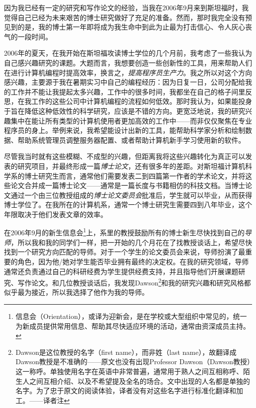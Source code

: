\documentclass[letter,12pt]{book}
\begin{document}
\begin{CJK}{UTF8}{gbsn}
因为我已经有一定的研究和写作论文的经验，当我在2006年9月来到斯坦福时，我觉得自己已经为未来艰苦的博士研究做好了充足的准备。然而，那时我完全没有预见到的是，我的博士第一年即将成为我生命中到此为止最为打击信心、令人灰心丧气的一段时间。



2006年的夏天，在我开始在斯坦福攻读博士学位的几个月前，我考虑了一些我认为自己感兴趣研究的课题。大题而言，我想要创造一些创新性的工具，用来帮助人们在进行计算机编程时提高效率，换言之，\emph{提高程序员生产力}。我之所以对这个方向感兴趣，主要源于我在暑期实习中自己的编程经历：因为日复一日，公司分配给我的工作并不能让我提起太多兴趣，工作中的很多时间，我都坐在自己的格子间里反思，在我工作的这些公司中计算机编程的流程如何低效。那时我认为，如果能投身于旨在降低这种低效性的科学研究，应该是不错的方向。更宽泛地说，我的研究兴趣集中在能让所有类型的计算机使用者更加高效的工作中——而非仅仅聚焦在专业程序员的身上。举例来说，我希望能设计出新的工具，能帮助科学家分析和绘制数据、帮助系统管理员调整服务器配置、或者帮助计算机新手学习使用新的软件。

尽管我当时就有这些模糊、不成型的兴趣，但距离我将这些兴趣转化为真正可以发表的研究项目，并最终形成一篇\emph{博士论文}，还有很多年的差距。对斯坦福计算机科学系的博士研究生而言，通常他们需要发表二到四篇第一作者的学术论文，并将这些论文合并成一篇博士论文——通常是一篇长度与书籍相仿的科技文档。当博士论文通过一个由三位教授组成的\emph{博士论文委员会}批准后，学生就可以毕业，从而获得博士学位了。在我所在的计算机系，通常一个博士研究生需要四到八年毕业，这个年限取决于他们发表文章的效率。

在2006年9月的新生信息会\footnote{信息会（Orientation），或译为迎新会，是在学校或大型组织中常见的，统一为新成员提供常用信息、帮助其尽快适应环境的活动，通常由资深成员主持。}上，系里的教授鼓励所有的博士新生尽快找到自己的\emph{导师}，所以我和我的同学们一样，把一开始的几个月花在了找教授谈话上，希望尽快找到一个研究方向匹配的导师。对于一个学生的论文委员会来说，导师扮演了最重要的角色，因为他/她对学生能否毕业拥有最终的决定权。在我的研究领域，导师通常还负责通过自己的科研经费为学生提供经费支持，并且指导他们开展课题研究、写作论文。和几位教授谈话后，我发现Dawson\footnote{Dawson是这位教授的名字（first name），而非姓（last name），故翻译成Dawson教授是不准确的——原文也没有出现Professor Dawson（Dawson教授）这一称呼。单独使用名字在英语中非常普遍，通常用于熟人之间互相称呼、陌生人之间互相介绍、以及不希望提及全名的场合。文中出现的人名都是单独的名字。为了忠于原文的阅读体验，译者没有对这些名字进行标准化翻译和加工。——译者注}和我的研究兴趣和研究风格都似乎最为接近，所以我选择了他作为我的导师。


\end{CJK}
\end{document}
